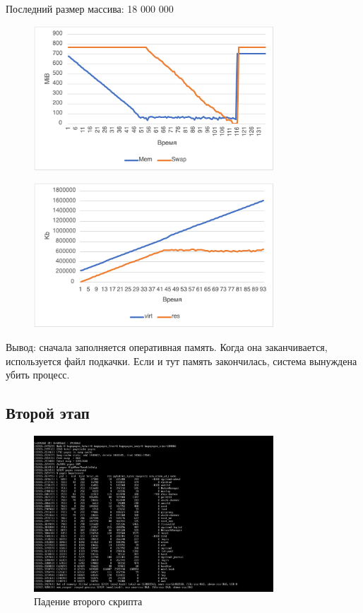 \documentclass{article}
\begin{document}
Последний размер массива: 18 000 000 

\begin{figure}[H]
\centering
\includegraphics[width=0.8\textwidth]{images/3.png}
\caption{}
\end{figure}

\begin{figure}[H]
\centering
\includegraphics[width=0.8\textwidth]{images/4.png}
\caption{}
\end{figure}

Вывод: сначала заполняется оперативная память. Когда она заканчивается, используется файл подкачки. Если и тут память закончилась, система вынуждена убить процесс. 

\subsection*{Второй этап}

\begin{figure}[H]
\centering
\includegraphics[width=0.8\textwidth]{images/5.png}
\caption{Падение второго скрипта}
\end{figure}
\end{document}
